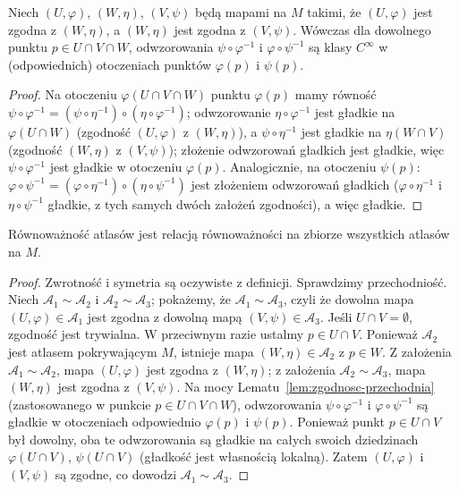 \begin{lemat}\label{lem:zgodnosc-przechodnia}
Niech $(U,\varphi)$, $(W,\eta)$, $(V,\psi)$ będą mapami na $M$ takimi, że $(U,\varphi)$
jest zgodna z $(W,\eta)$, a $(W,\eta)$ jest zgodna z $(V,\psi)$. Wówczas dla dowolnego
punktu $p\in U\cap V\cap W$, odwzorowania $\psi\circ\varphi^{-1}$ i $\varphi\circ\psi^{-1}$
są klasy $C^\infty$ w (odpowiednich) otoczeniach punktów $\varphi(p)$ i $\psi(p)$.
\end{lemat}

\begin{proof}
Na otoczeniu $\varphi(U\cap V\cap W)$ punktu $\varphi(p)$ mamy równość
$\psi\circ\varphi^{-1}=(\psi\circ\eta^{-1})\circ(\eta\circ\varphi^{-1})$; odwzorowanie
$\eta\circ\varphi^{-1}$ jest gładkie na $\varphi(U\cap W)$ (zgodność $(U,\varphi)$ z
$(W,\eta)$), a $\psi\circ\eta^{-1}$ jest gładkie na $\eta(W\cap V)$ (zgodność $(W,\eta)$ z
$(V,\psi)$); złożenie odwzorowań gładkich jest gładkie, więc $\psi\circ\varphi^{-1}$ jest
gładkie w otoczeniu $\varphi(p)$. Analogicznie, na otoczeniu $\psi(p)$:
$\varphi\circ\psi^{-1}=(\varphi\circ\eta^{-1})\circ(\eta\circ\psi^{-1})$ jest złożeniem
odwzorowań gładkich ($\varphi\circ\eta^{-1}$ i $\eta\circ\psi^{-1}$ gładkie, z tych samych
dwóch założeń zgodności), a więc gładkie.
\end{proof}

\begin{stwierdzenie}
Równoważność atlasów jest relacją równoważności na zbiorze wszystkich atlasów na $M$.
\end{stwierdzenie}

\begin{proof}
Zwrotność i symetria są oczywiste z definicji. Sprawdzimy przechodniość. Niech
$\mathcal{A}_1\sim\mathcal{A}_2$ i $\mathcal{A}_2\sim\mathcal{A}_3$; pokażemy, że
$\mathcal{A}_1\sim\mathcal{A}_3$, czyli że dowolna mapa $(U,\varphi)\in\mathcal{A}_1$ jest
zgodna z dowolną mapą $(V,\psi)\in\mathcal{A}_3$. Jeśli $U\cap V=\emptyset$, zgodność jest
trywialna. W przeciwnym razie ustalmy $p\in U\cap V$. Ponieważ $\mathcal{A}_2$ jest atlasem
pokrywającym $M$, istnieje mapa $(W,\eta)\in\mathcal{A}_2$ z $p\in W$. Z założenia
$\mathcal{A}_1\sim\mathcal{A}_2$, mapa $(U,\varphi)$ jest zgodna z $(W,\eta)$; z założenia
$\mathcal{A}_2\sim\mathcal{A}_3$, mapa $(W,\eta)$ jest zgodna z $(V,\psi)$. Na mocy
Lematu~\ref{lem:zgodnosc-przechodnia} (zastosowanego w punkcie $p\in U\cap V\cap W$),
odwzorowania $\psi\circ\varphi^{-1}$ i $\varphi\circ\psi^{-1}$ są gładkie w otoczeniach
odpowiednio $\varphi(p)$ i $\psi(p)$. Ponieważ punkt $p\in U\cap V$ był dowolny, oba te
odwzorowania są gładkie na całych swoich dziedzinach $\varphi(U\cap V)$, $\psi(U\cap V)$
(gładkość jest własnością lokalną). Zatem $(U,\varphi)$ i $(V,\psi)$ są zgodne, co dowodzi
$\mathcal{A}_1\sim\mathcal{A}_3$.
\end{proof}

